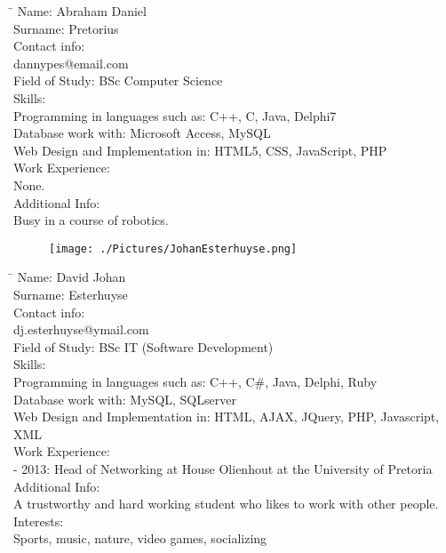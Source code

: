 \documentclass[12pt]{article}
\begin{document}
	\begin{tabbing}
		\hspace*{3.5cm}\=\hspace*{3cm} \kill
		Name: \> Abraham Daniel \\
		Surname: \>  Pretorius \\
		Contact info:  \\
			\> dannypes@email.com	\\	
		Field of Study: \> BSc Computer Science \\
		Skills: \\
			\> Programming in languages such as: C++, C, Java, Delphi7 \\
			\> Database work with: Microsoft Access, MySQL \\
			\> Web Design and Implementation in: HTML5, CSS, JavaScript, PHP \\
		Work  Experience: \\
			\> None. \\
		Additional Info: \\
			\> Busy in a course of robotics. \\		
	\end{tabbing}
	
	\newpage
	
	\begin{figure}[ht!]
		\centering
		\texttt{[image: ./Pictures/JohanEsterhuyse.png]}
	\end{figure}
	
	\begin{tabbing}
		\hspace*{3.5cm}\=\hspace*{3cm} \kill
		Name:	\>David Johan\\
		Surname:	\> Esterhuyse \\
		Contact info:	\> 0738134527 \\
			\> dj.esterhuyse@ymail.com \\
		Field of Study:	\> BSc IT (Software Development) \\
		Skills:	\\
			\>	Programming in languages such as: C++, C\#, Java, Delphi, Ruby \\
			\>	Database work with: MySQL, SQLserver \\
			\>	Web Design and Implementation in: HTML, AJAX, JQuery, PHP, Javascript, XML \\
			Work Experience: \\
				 - 2013: Head of Networking at House Olienhout at the University of Pretoria \\
			Additional Info: \\
			\> A trustworthy and hard working student who likes to work with other people.\\
			Interests: \\
			\> Sports, music, nature, video games, socializing \\
		\end{tabbing}
	
	
\end{document}
